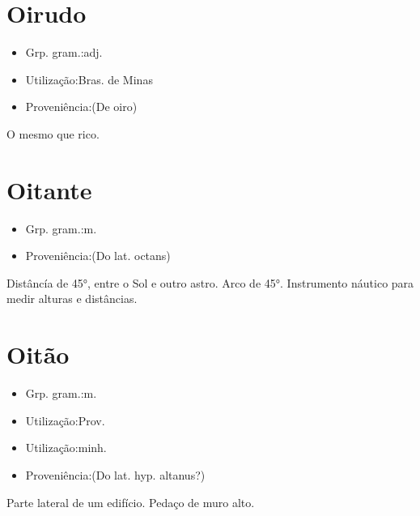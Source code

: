 \section{Oirudo}
\begin{itemize}
\item {Grp. gram.:adj.}
\end{itemize}
\begin{itemize}
\item {Utilização:Bras. de Minas}
\end{itemize}
\begin{itemize}
\item {Proveniência:(De \textunderscore oiro\textunderscore )}
\end{itemize}
O mesmo que \textunderscore rico\textunderscore .
\section{Oitante}
\begin{itemize}
\item {Grp. gram.:m.}
\end{itemize}
\begin{itemize}
\item {Proveniência:(Do lat. \textunderscore octans\textunderscore )}
\end{itemize}
Distâncía de 45°, entre o Sol e outro astro.
Arco de 45°.
Instrumento náutico para medir alturas e distâncias.
\section{Oitão}
\begin{itemize}
\item {Grp. gram.:m.}
\end{itemize}
\begin{itemize}
\item {Utilização:Prov.}
\end{itemize}
\begin{itemize}
\item {Utilização:minh.}
\end{itemize}
\begin{itemize}
\item {Proveniência:(Do lat. hyp. \textunderscore altanus\textunderscore ?)}
\end{itemize}
Parte lateral de um edifício.
Pedaço de muro alto.
